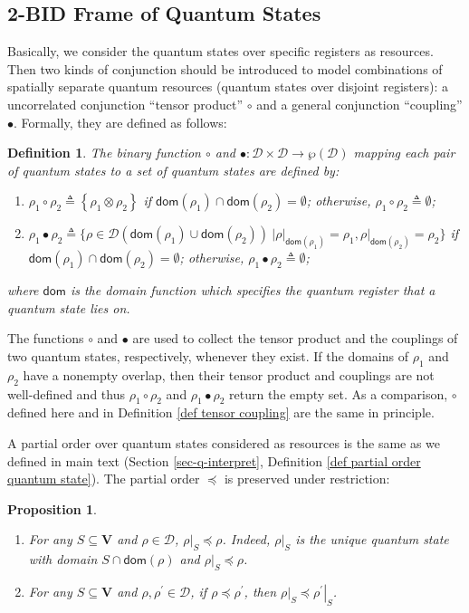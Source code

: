 \documentclass[conference,compsoc, 10pt]{IEEEtran}
\newtheorem{definition}{Definition}[section]
\newtheorem{proposition}{Proposition}[section]
\newcommand {\cD } {{\mathcal{D}}}
\newcommand {\types } {{\mathsf{dom}}}
\newcommand {\type }[1] {{\mathsf{dom}\!\left(#1\right)}}
\newcommand {\rt }[2] {{\left.{#1}\right|_{#2}}}
\newcommand {\vars } {\mathbf{V}}
\begin{document}
\begin{appendices}
		\subsection{2-BID Frame of Quantum States}
		
		Basically, we consider the quantum states over specific registers as resources. Then two kinds of conjunction should be introduced to model combinations of spatially separate quantum resources (quantum states over disjoint registers):  a uncorrelated conjunction ``tensor product'' $\circ$ and a general conjunction ``coupling'' $\bullet$. Formally, they are defined as follows:
		
		\begin{definition}
			\label{def tensor coupling 2BID}
			The binary function $\circ$ and $\bullet: \cD\times\cD\rightarrow \wp(\cD)$ mapping each  pair of quantum states to a set of quantum states are defined by: 
			\begin{enumerate}
				\item $\rho_1\circ\rho_2\triangleq\left\{\rho_1\otimes\rho_2\right\}$ if $\type{\rho_1}\cap \type{\rho_2}=\emptyset$; otherwise, $\rho_1\circ\rho_2\triangleq\emptyset$;
				\item $\rho_1\bullet\rho_2\triangleq\big\{\rho\in\cD(\type{\rho_1}\cup \type{\rho_2})\ \big| \rt{\rho}{\type{\rho_1}} = \rho_1, \rt{\rho}{\type{\rho_2}} = \rho_2 \big\}$ if $\type{\rho_1}\cap \type{\rho_2}=\emptyset$; otherwise, $\rho_1\bullet\rho_2\triangleq\emptyset$;
			\end{enumerate}		
			where $\types$ is the domain function which specifies  the quantum register that a quantum state lies on. 
		\end{definition}	
		
		The functions $\circ$ and $\bullet$ are used to collect the tensor product and the couplings of two quantum states,  respectively, whenever they exist. If the domains of $\rho_1$ and $\rho_2$ have a nonempty overlap, then their tensor product and couplings are not well-defined and thus $\rho_1\circ\rho_2$ and $\rho_1\bullet\rho_2$ return the empty set. As a comparison, $\circ$ defined here and in Definition \ref{def tensor coupling} are the same in principle.  
		
		A partial order over quantum states considered as resources is the same as we defined in main text (Section \ref{sec-q-interpret}, Definition \ref{def partial order quantum state}).
		The partial order $\preceq$ is preserved under restriction:
		\begin{proposition}
			\label{pro-order-rt}
			\begin{enumerate}
				\item For any $S\subseteq \vars$ and $\rho\in\cD$,  $\rt{\rho}{S}\preceq\rho$. Indeed,  $\rt{\rho}{S}$ is the unique quantum state with domain  $S\cap\type{\rho}$ and $\rt{\rho}{S}\preceq\rho$.
				\item For any $S\subseteq \vars$ and $\rho,\rho^\prime\in\cD$, if $\rho\preceq\rho^\prime$, then $\rt{\rho}{S}\preceq\rt{\rho^\prime}{S}$.
			\end{enumerate}
		\end{proposition}
		

\end{appendices}
\end{document}
